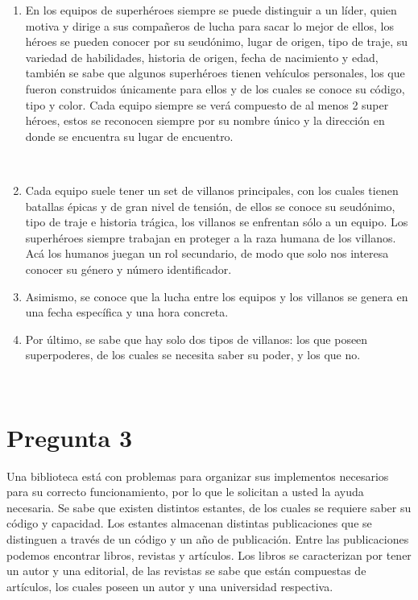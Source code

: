 \documentclass[letterpaper]{article}
\begin{document}
\begin{enumerate}

\item	En los equipos de superhéroes siempre se puede distinguir a un líder, quien motiva y dirige a sus compañeros de lucha para sacar lo mejor de ellos, los héroes se pueden conocer por su seudónimo, lugar de origen, tipo de traje, su variedad de habilidades, historia de origen, fecha de nacimiento y edad, también se sabe que algunos superhéroes tienen vehículos personales, los que fueron construidos únicamente para ellos y de los cuales se conoce su código, tipo y color. Cada equipo siempre se verá compuesto de al menos 2 super héroes, estos se reconocen siempre por su nombre único y la dirección en donde se encuentra su lugar de encuentro.
 
 
\item	Cada equipo suele tener un set de villanos principales, con los cuales tienen batallas épicas y de gran nivel de tensión, de ellos se conoce su seudónimo, tipo de traje e historia trágica, los villanos se enfrentan sólo a un equipo. Los superhéroes siempre trabajan en proteger a la raza humana de los villanos. Acá los humanos juegan un rol secundario, de modo que solo nos interesa conocer su género y número identificador.
 

\item	Asimismo, se conoce que la lucha entre los equipos y los villanos se genera en una fecha específica y una hora concreta.
 

\item	Por último, se sabe que hay solo dos tipos de villanos: los que poseen superpoderes, de los cuales se necesita saber su poder, y los que no.
 
\end{enumerate}
 
\section{Pregunta 3}

Una biblioteca está con problemas para organizar sus implementos necesarios para su correcto funcionamiento, por lo que le solicitan a usted la ayuda necesaria. Se sabe que existen distintos estantes, de los cuales se requiere saber su código y capacidad. Los estantes almacenan distintas publicaciones que se distinguen a través de un código y un año de publicación. Entre las publicaciones podemos encontrar libros, revistas y artículos. Los libros se caracterizan por tener un autor y una editorial, de las revistas se sabe que están compuestas de artículos, los cuales poseen un autor y una universidad respectiva. 
\end{document}
